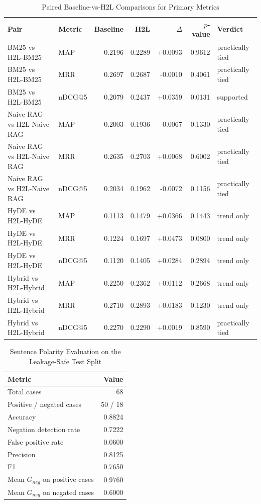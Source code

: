 \begin{table}[t]
\centering
\caption{Paired Baseline-vs-H2L Comparisons for Primary Metrics}
\label{tab:paired_comparison}
\begin{tabular}{llrrrrl}
\toprule
Pair & Metric & Baseline & H2L & $\Delta$ & $p$-value & Verdict \\
\midrule
BM25 vs H2L-BM25 & MAP & 0.2196 & 0.2289 & +0.0093 & 0.9612 & practically tied \\
BM25 vs H2L-BM25 & MRR & 0.2697 & 0.2687 & -0.0010 & 0.4061 & practically tied \\
BM25 vs H2L-BM25 & nDCG@5 & 0.2079 & 0.2437 & +0.0359 & 0.0131 & supported \\
Naive RAG vs H2L-Naive RAG & MAP & 0.2003 & 0.1936 & -0.0067 & 0.1330 & practically tied \\
Naive RAG vs H2L-Naive RAG & MRR & 0.2635 & 0.2703 & +0.0068 & 0.6002 & practically tied \\
Naive RAG vs H2L-Naive RAG & nDCG@5 & 0.2034 & 0.1962 & -0.0072 & 0.1156 & practically tied \\
HyDE vs H2L-HyDE & MAP & 0.1113 & 0.1479 & +0.0366 & 0.1443 & trend only \\
HyDE vs H2L-HyDE & MRR & 0.1224 & 0.1697 & +0.0473 & 0.0800 & trend only \\
HyDE vs H2L-HyDE & nDCG@5 & 0.1120 & 0.1405 & +0.0284 & 0.2894 & trend only \\
Hybrid vs H2L-Hybrid & MAP & 0.2250 & 0.2362 & +0.0112 & 0.2668 & trend only \\
Hybrid vs H2L-Hybrid & MRR & 0.2710 & 0.2893 & +0.0183 & 0.1230 & trend only \\
Hybrid vs H2L-Hybrid & nDCG@5 & 0.2270 & 0.2290 & +0.0019 & 0.8590 & practically tied \\
\bottomrule
\end{tabular}
\end{table}

\begin{table}[t]
\centering
\caption{Sentence Polarity Evaluation on the Leakage-Safe Test Split}
\label{tab:sentence_polarity}
\begin{tabular}{lr}
\toprule
Metric & Value \\
\midrule
Total cases & 68 \\
Positive / negated cases & 50 / 18 \\
Accuracy & 0.8824 \\
Negation detection rate & 0.7222 \\
False positive rate & 0.0600 \\
Precision & 0.8125 \\
F1 & 0.7650 \\
Mean $G_{neg}$ on positive cases & 0.9760 \\
Mean $G_{neg}$ on negated cases & 0.6000 \\
\bottomrule
\end{tabular}
\end{table}

